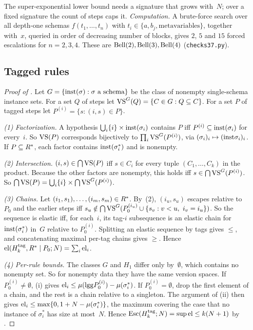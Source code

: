 The super-exponential lower bound needs a signature that grows with~$N$; over a fixed signature the count of steps caps it. \emph{Computation.} A brute-force search over all depth-one schemas $f(t_1,\dots,t_n)$ with $t_i\in\{a,b_j,\text{metavariables}\}$, together with~$x$, queried in order of decreasing number of blocks, gives $2$, $5$ and $15$ forced escalations for $n=2,3,4$. These are $\mathrm{Bell}(2),\mathrm{Bell}(3),\mathrm{Bell}(4)$ (\texttt{checks37.py}).

\subsection{Tagged rules}\label{app:caution:tagged}

\begin{proof}[Proof of ]
Let $G=\{\mathrm{inst}(\sigma):\sigma\text{ a schema}\}$ be the class of nonempty single-schema instance sets. For a set $Q$ of steps let $\mathrm{VS}^G(Q)=\{C\in G:Q\subseteq C\}$. For a set $P$ of tagged steps let $P^{(i)}=\{s:(i,s)\in P\}$.

\emph{(1) Factorization.} A hypothesis $\bigcup_i\{i\}\times\mathrm{inst}(\sigma_i)$ contains $P$ iff $P^{(i)}\subseteq\mathrm{inst}(\sigma_i)$ for every~$i$. So $\mathrm{VS}(P)$ corresponds bijectively to $\prod_i\mathrm{VS}^G(P^{(i)})$, via $(\sigma_i)_i\mapsto(\mathrm{inst}\sigma_i)_i$. If $P\subseteq R^{*}$, each factor contains $\mathrm{inst}(\sigma_i^*)$ and is nonempty.

\emph{(2) Intersection.} $(i,s)\in\bigcap\mathrm{VS}(P)$ iff $s\in C_i$ for every tuple $(C_1,\dots,C_k)$ in the product. Because the other factors are nonempty, this holds iff $s\in\bigcap\mathrm{VS}^G(P^{(i)})$. So $\bigcap\mathrm{VS}(P)=\bigcup_i\{i\}\times\bigcap\mathrm{VS}^G(P^{(i)})$.

\emph{(3) Chains.} Let $(i_1,s_1),\dots,(i_m,s_m)\in R^{*}$. By~(2), $(i_u,s_u)$ escapes relative to $P_0$ and the earlier steps iff $s_u\notin\bigcap\VS^G(P_0^{(i_u)}\cup\{s_v:v<u,\ i_v=i_u\})$. So the sequence is elastic iff, for each~$i$, its tag-$i$ subsequence is an elastic chain for $\mathrm{inst}(\sigma^*_i)$ in~$G$ relative to $P_0^{(i)}$. Splitting an elastic sequence by tags gives $\le$, and concatenating maximal per-tag chains gives $\ge$. Hence $\mathrm{el}(H^{\mathrm{tag}}_{k},R^{*}\mid P_0;N)=\sum_i\mathrm{el}_i$.

\emph{(4) Per-rule bounds.} The classes $G$ and $H_1$ differ only by~$\emptyset$, which contains no nonempty set. So for nonempty data they have the same version spaces. If $P_0^{(i)}\neq\emptyset$, (i) gives $\mathrm{el}_i\le\mu(\mathrm{lgg} P_0^{(i)})-\mu(\sigma_i^*)$. If $P_0^{(i)}=\emptyset$, drop the first element of a chain, and the rest is a chain relative to a singleton. The argument of (ii) then gives $\mathrm{el}_i\le\max\{0,1+N-\mu(\sigma_i^*)\}$, the maximum covering the case that no instance of $\sigma_i^*$ has size at most~$N$. Hence $\mathrm{Esc}(H^{\mathrm{tag}}_{k};N)=\sup\mathrm{el}\le k(N+1)$ by .


\end{proof}
